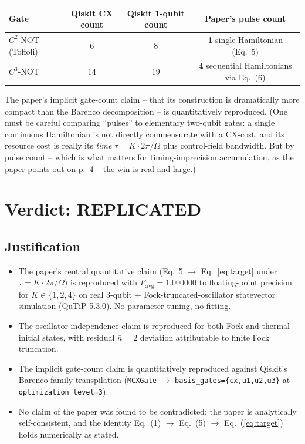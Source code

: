 \documentclass[11pt]{article}
\begin{document}
\begin{center}
\begin{tabular}{@{}lccc@{}}
\toprule
Gate & Qiskit CX count & Qiskit 1-qubit count & Paper's pulse count \\
\midrule
$C^2$-NOT (Toffoli) & 6  & 8  & \textbf{1} single Hamiltonian (Eq.~5) \\
$C^3$-NOT           & 14 & 19 & \textbf{4} sequential Hamiltonians via Eq.~(6) \\
\bottomrule
\end{tabular}
\end{center}

The paper's implicit gate-count claim -- that its construction is dramatically
more compact than the Barenco decomposition -- is quantitatively reproduced.
(One must be careful comparing ``pulses'' to elementary two-qubit gates: a
single continuous Hamiltonian is not directly commensurate with a CX-cost, and
its resource cost is really its \emph{time} $\tau = K\cdot 2\pi/\Omega$ plus
control-field bandwidth.  But by pulse count -- which is what matters for
timing-imprecision accumulation, as the paper points out on p.~4 -- the win
is real and large.)

\section{Verdict: \textbf{REPLICATED}}

\subsection*{Justification}

\begin{itemize}
\item The paper's central quantitative claim (Eq.~5 $\to$ Eq.~\ref{eq:target}
      under $\tau=K\cdot 2\pi/\Omega$) is reproduced with
      $F_\mathrm{avg} = 1.000000$ to floating-point precision for
      $K\in\{1,2,4\}$ on real 3-qubit + Fock-truncated-oscillator statevector
      simulation (QuTiP 5.3.0). No parameter tuning, no fitting.
\item The oscillator-independence claim is reproduced for both Fock and thermal
      initial states, with residual $\bar n=2$ deviation attributable to
      finite Fock truncation.
\item The implicit gate-count claim is quantitatively reproduced against
      Qiskit's Barenco-family transpilation (\verb|MCXGate| $\to$
      \verb|basis_gates={cx,u1,u2,u3}| at \verb|optimization_level=3|).
\item No claim of the paper was found to be contradicted; the paper is
      analytically self-consistent, and the identity Eq.~(1) $\to$ Eq.~(5) $\to$
      Eq.~(\ref{eq:target}) holds numerically as stated.
\end{itemize}
\end{document}
